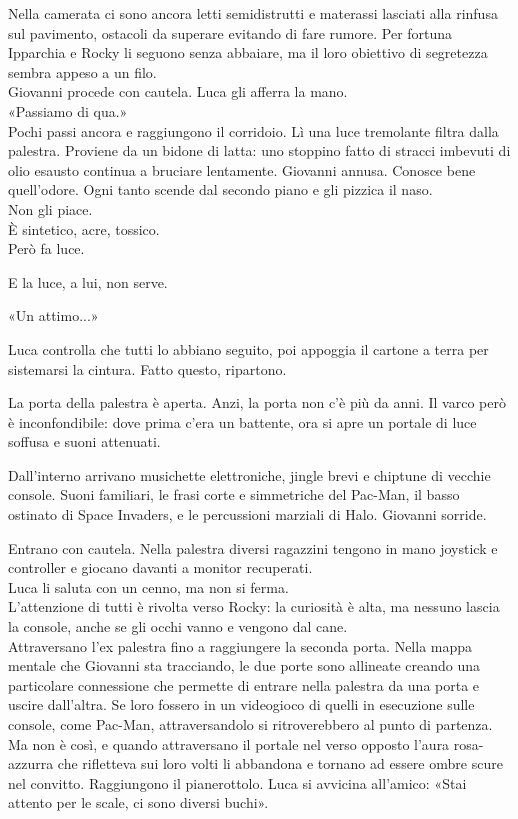 \documentclass[10pt,oneside]{extbook}
\begin{document}
\par\medskip
Nella camerata ci sono ancora letti semidistrutti e materassi lasciati alla rinfusa sul pavimento, ostacoli da superare evitando di fare rumore. Per fortuna Ipparchia e Rocky li seguono senza abbaiare, ma il loro obiettivo di segretezza sembra appeso a un filo.\\
Giovanni procede con cautela.  Luca gli afferra la mano.\\
«Passiamo di qua.»\\
Pochi passi ancora e raggiungono il corridoio.
Lì una luce tremolante filtra dalla palestra. Proviene da un bidone di latta: uno stoppino fatto di stracci imbevuti di olio esausto continua a bruciare lentamente.
Giovanni annusa. Conosce bene quell'odore. Ogni tanto scende dal secondo piano e gli pizzica il naso.\\
Non gli piace.\\
\`E sintetico, acre, tossico.\\
Però fa luce.

\par\medskip
E la luce, a lui, non serve.

\par\medskip
\par\medskip
«Un attimo...»

\par\medskip
Luca controlla che tutti lo abbiano seguito, poi appoggia il cartone a terra per sistemarsi la cintura. Fatto questo, ripartono.

La porta della palestra \`e aperta. Anzi, la porta non c'\`e pi\`u da anni. Il varco per\`o \`e inconfondibile: dove prima c'era un battente, ora si apre un portale di luce soffusa e suoni attenuati.

Dall'interno arrivano musichette elettroniche, jingle brevi e chiptune  di vecchie console. Suoni familiari, le frasi corte e simmetriche del Pac-Man, il basso ostinato di Space Invaders, e le percussioni marziali di Halo.  Giovanni sorride.

\par\medskip
Entrano con cautela. Nella palestra diversi ragazzini tengono in mano joystick e controller e giocano davanti a monitor recuperati.\\
Luca li saluta con un cenno, ma non si ferma.\\
L’attenzione di tutti \`e rivolta verso Rocky: la curiosità \`e alta, ma nessuno lascia la console, anche se gli occhi vanno e vengono dal cane.\\
Attraversano l'ex palestra fino a raggiungere la seconda porta.  Nella mappa mentale che  Giovanni  sta tracciando, le due porte sono allineate creando una particolare connessione  che permette di entrare nella palestra da una porta e uscire dall'altra. Se loro fossero in un videogioco di quelli in esecuzione sulle console, come Pac-Man, attraversandolo si ritroverebbero al punto di partenza. Ma non \`e cos\`i, e quando attraversano il portale nel verso opposto  l'aura rosa-azzurra che rifletteva sui loro volti li abbandona e tornano ad essere  ombre scure nel convitto. Raggiungono il pianerottolo. Luca si avvicina all'amico: «Stai attento per le scale, ci sono diversi buchi».
\end{document}

